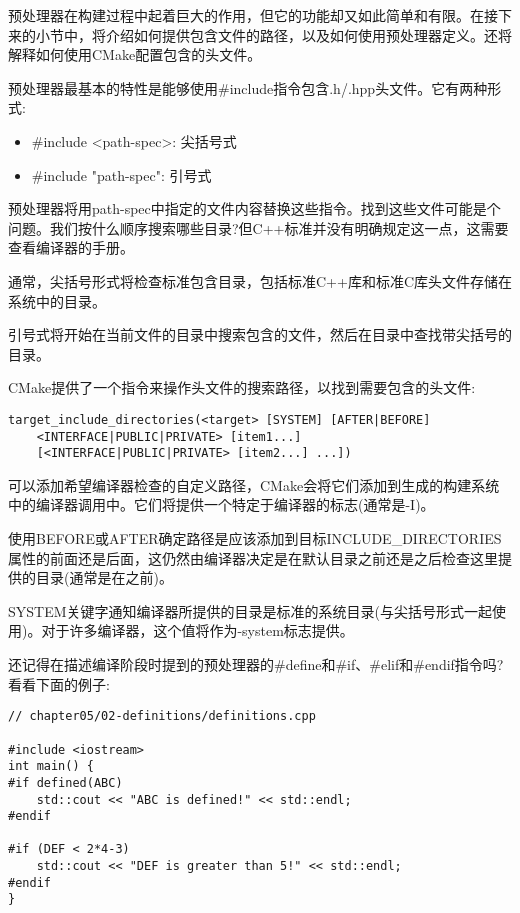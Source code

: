
预处理器在构建过程中起着巨大的作用，但它的功能却又如此简单和有限。在接下来的小节中，将介绍如何提供包含文件的路径，以及如何使用预处理器定义。还将解释如何使用CMake配置包含的头文件。


预处理器最基本的特性是能够使用\#include指令包含.h/.hpp头文件。它有两种形式:

\begin{itemize}
\item 
\#include <path-spec>: 尖括号式

\item 
\#include "path-spec": 引号式
\end{itemize}

预处理器将用path-spec中指定的文件内容替换这些指令。找到这些文件可能是个问题。我们按什么顺序搜索哪些目录?但C++标准并没有明确规定这一点，这需要查看编译器的手册。

通常，尖括号形式将检查标准包含目录，包括标准C++库和标准C库头文件存储在系统中的目录。

引号式将开始在当前文件的目录中搜索包含的文件，然后在目录中查找带尖括号的目录。

CMake提供了一个指令来操作头文件的搜索路径，以找到需要包含的头文件:

\begin{lstlisting}[style=styleCMake]
target_include_directories(<target> [SYSTEM] [AFTER|BEFORE]
	<INTERFACE|PUBLIC|PRIVATE> [item1...]
	[<INTERFACE|PUBLIC|PRIVATE> [item2...] ...])
\end{lstlisting}

可以添加希望编译器检查的自定义路径，CMake会将它们添加到生成的构建系统中的编译器调用中。它们将提供一个特定于编译器的标志(通常是-I)。

使用BEFORE或AFTER确定路径是应该添加到目标INCLUDE\_DIRECTORIES属性的前面还是后面，这仍然由编译器决定是在默认目录之前还是之后检查这里提供的目录(通常是在之前)。

SYSTEM关键字通知编译器所提供的目录是标准的系统目录(与尖括号形式一起使用)。对于许多编译器，这个值将作为-system标志提供。


还记得在描述编译阶段时提到的预处理器的\#define和\#if、\#elif和\#endif指令吗?看看下面的例子:

\begin{lstlisting}[style=styleCXX]
// chapter05/02-definitions/definitions.cpp

#include <iostream>
int main() {
#if defined(ABC)
	std::cout << "ABC is defined!" << std::endl;
#endif

#if (DEF < 2*4-3)
	std::cout << "DEF is greater than 5!" << std::endl;
#endif
}
\end{lstlisting}

